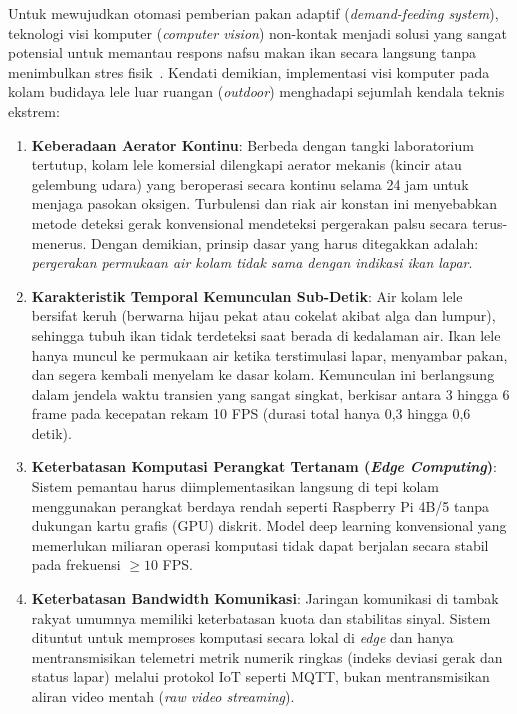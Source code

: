 Untuk mewujudkan otomasi pemberian pakan adaptif (\textit{demand-feeding system}), teknologi visi komputer (\textit{computer vision}) non-kontak menjadi solusi yang sangat potensial untuk memantau respons nafsu makan ikan secara langsung tanpa menimbulkan stres fisik~\cite{Al-Abri2025,Yang2025}. Kendati demikian, implementasi visi komputer pada kolam budidaya lele luar ruangan (\textit{outdoor}) menghadapi sejumlah kendala teknis ekstrem:
\begin{enumerate}
    \item \textbf{Keberadaan Aerator Kontinu}: Berbeda dengan tangki laboratorium tertutup, kolam lele komersial dilengkapi aerator mekanis (kincir atau gelembung udara) yang beroperasi secara kontinu selama 24 jam untuk menjaga pasokan oksigen. Turbulensi dan riak air konstan ini menyebabkan metode deteksi gerak konvensional mendeteksi pergerakan palsu secara terus-menerus. Dengan demikian, prinsip dasar yang harus ditegakkan adalah: \textit{pergerakan permukaan air kolam tidak sama dengan indikasi ikan lapar}.
    \item \textbf{Karakteristik Temporal Kemunculan Sub-Detik}: Air kolam lele bersifat keruh (berwarna hijau pekat atau cokelat akibat alga dan lumpur), sehingga tubuh ikan tidak terdeteksi saat berada di kedalaman air. Ikan lele hanya muncul ke permukaan air ketika terstimulasi lapar, menyambar pakan, dan segera kembali menyelam ke dasar kolam. Kemunculan ini berlangsung dalam jendela waktu transien yang sangat singkat, berkisar antara 3 hingga 6 frame pada kecepatan rekam 10 FPS (durasi total hanya 0,3 hingga 0,6 detik).
    \item \textbf{Keterbatasan Komputasi Perangkat Tertanam (\textit{Edge Computing})}: Sistem pemantau harus diimplementasikan langsung di tepi kolam menggunakan perangkat berdaya rendah seperti Raspberry Pi 4B/5 tanpa dukungan kartu grafis (GPU) diskrit. Model deep learning konvensional yang memerlukan miliaran operasi komputasi tidak dapat berjalan secara stabil pada frekuensi $\ge 10$ FPS.
    \item \textbf{Keterbatasan Bandwidth Komunikasi}: Jaringan komunikasi di tambak rakyat umumnya memiliki keterbatasan kuota dan stabilitas sinyal. Sistem dituntut untuk memproses komputasi secara lokal di \textit{edge} dan hanya mentransmisikan telemetri metrik numerik ringkas (indeks deviasi gerak dan status lapar) melalui protokol IoT seperti MQTT, bukan mentransmisikan aliran video mentah (\textit{raw video streaming}).
\end{enumerate}


